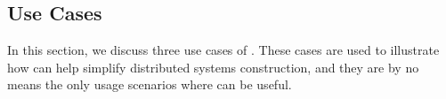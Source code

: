 






\iffalse
\subsection{Use Cases}
\label{subsec:application-scenarios}

In this section, we discuss three use cases of \sys.
These cases are used to illustrate how \sys can help simplify distributed systems construction, and they are by no means the only usage scenarios where \sys can be useful.

